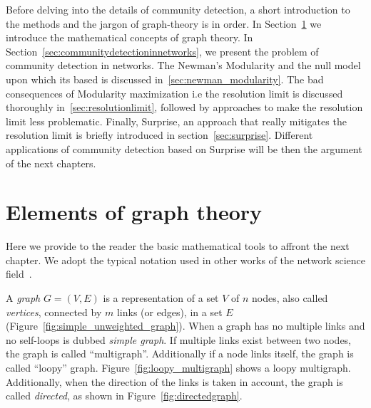 Before delving into the details of community detection, a short introduction to the methods and the jargon of graph-theory is in order.
In Section~\ref{sec:elementsofgraphtheory} we introduce the mathematical concepts of graph theory. In Section~\ref{sec:communitydetectioninnetworks}, we present the problem of community detection in networks. The Newman's Modularity and the null model upon which its based is discussed in~\ref{sec:newman_modularity}. The bad consequences of Modularity maximization i.e the resolution limit is discussed thoroughly in~\ref{sec:resolutionlimit}, followed by approaches to make the resolution limit less problematic.
Finally, Surprise, an approach that really mitigates the resolution limit is briefly introduced in section~\ref{sec:surprise}. Different applications of community detection based on Surprise will be then the argument of the next chapters.

\section{Elements of graph theory}\label{sec:elementsofgraphtheory}
Here we provide to the reader the basic mathematical tools to affront the next chapter. We adopt the typical notation used in other works of the network science field~\cite{newman2010book,Estrada2011}.

A \emph{graph} $G=(V,E)$ is a representation of a set $V$ of $n$ nodes, also called \emph{vertices}, connected by $m$ links (or edges), in a set $E$ (Figure~\ref{fig:simple_unweighted_graph}). When a graph has no multiple links and no self-loops is dubbed \emph{simple graph}.
If multiple links exist between two nodes, the graph is called ``multigraph''. Additionally if a node links itself, the graph is called ``loopy'' graph. Figure~\ref{fig:loopy_multigraph} shows a loopy multigraph. Additionally, when the direction of the links is taken in account, the graph is called \emph{directed}, as shown in Figure~\ref{fig:directedgraph}.


